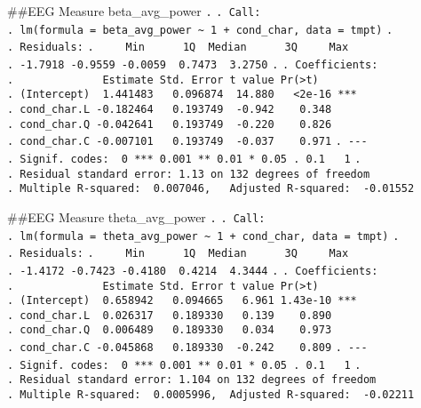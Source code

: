 \documentclass[
]{article}
\begin{document}
\#\#EEG Measure beta\_avg\_power \texttt{.} \texttt{.\ Call:}
\texttt{.\ lm(formula\ =\ beta\_avg\_power\ \textasciitilde{}\ 1\ +\ cond\_char,\ data\ =\ tmpt)}
\texttt{.} \texttt{.\ Residuals:}
\texttt{.\ \ \ \ \ Min\ \ \ \ \ \ 1Q\ \ Median\ \ \ \ \ \ 3Q\ \ \ \ \ Max}
\texttt{.\ -1.7918\ -0.9559\ -0.0059\ \ 0.7473\ \ 3.2750} \texttt{.}
\texttt{.\ Coefficients:}
\texttt{.\ \ \ \ \ \ \ \ \ \ \ \ \ \ Estimate\ Std.\ Error\ t\ value\ Pr(\textgreater{}\textbar{}t\textbar{})}
\texttt{.\ (Intercept)\ \ 1.441483\ \ \ 0.096874\ \ 14.880\ \ \ \textless{}2e-16\ ***}
\texttt{.\ cond\_char.L\ -0.182464\ \ \ 0.193749\ \ -0.942\ \ \ \ 0.348}
\texttt{.\ cond\_char.Q\ -0.042641\ \ \ 0.193749\ \ -0.220\ \ \ \ 0.826}
\texttt{.\ cond\_char.C\ -0.007101\ \ \ 0.193749\ \ -0.037\ \ \ \ 0.971}
\texttt{.\ -\/-\/-}
\texttt{.\ Signif.\ codes:\ \ 0\ \textquotesingle{}***\textquotesingle{}\ 0.001\ \textquotesingle{}**\textquotesingle{}\ 0.01\ \textquotesingle{}*\textquotesingle{}\ 0.05\ \textquotesingle{}.\textquotesingle{}\ 0.1\ \textquotesingle{}\ \textquotesingle{}\ 1}
\texttt{.}
\texttt{.\ Residual\ standard\ error:\ 1.13\ on\ 132\ degrees\ of\ freedom}
\texttt{.\ Multiple\ R-squared:\ \ 0.007046,\ \ \ Adjusted\ R-squared:\ \ -0.01552}

\#\#EEG Measure theta\_avg\_power \texttt{.} \texttt{.\ Call:}
\texttt{.\ lm(formula\ =\ theta\_avg\_power\ \textasciitilde{}\ 1\ +\ cond\_char,\ data\ =\ tmpt)}
\texttt{.} \texttt{.\ Residuals:}
\texttt{.\ \ \ \ \ Min\ \ \ \ \ \ 1Q\ \ Median\ \ \ \ \ \ 3Q\ \ \ \ \ Max}
\texttt{.\ -1.4172\ -0.7423\ -0.4180\ \ 0.4214\ \ 4.3444} \texttt{.}
\texttt{.\ Coefficients:}
\texttt{.\ \ \ \ \ \ \ \ \ \ \ \ \ \ Estimate\ Std.\ Error\ t\ value\ Pr(\textgreater{}\textbar{}t\textbar{})}
\texttt{.\ (Intercept)\ \ 0.658942\ \ \ 0.094665\ \ \ 6.961\ 1.43e-10\ ***}
\texttt{.\ cond\_char.L\ \ 0.026317\ \ \ 0.189330\ \ \ 0.139\ \ \ \ 0.890}
\texttt{.\ cond\_char.Q\ \ 0.006489\ \ \ 0.189330\ \ \ 0.034\ \ \ \ 0.973}
\texttt{.\ cond\_char.C\ -0.045868\ \ \ 0.189330\ \ -0.242\ \ \ \ 0.809}
\texttt{.\ -\/-\/-}
\texttt{.\ Signif.\ codes:\ \ 0\ \textquotesingle{}***\textquotesingle{}\ 0.001\ \textquotesingle{}**\textquotesingle{}\ 0.01\ \textquotesingle{}*\textquotesingle{}\ 0.05\ \textquotesingle{}.\textquotesingle{}\ 0.1\ \textquotesingle{}\ \textquotesingle{}\ 1}
\texttt{.}
\texttt{.\ Residual\ standard\ error:\ 1.104\ on\ 132\ degrees\ of\ freedom}
\texttt{.\ Multiple\ R-squared:\ \ 0.0005996,\ \ Adjusted\ R-squared:\ \ -0.02211}
\end{document}
